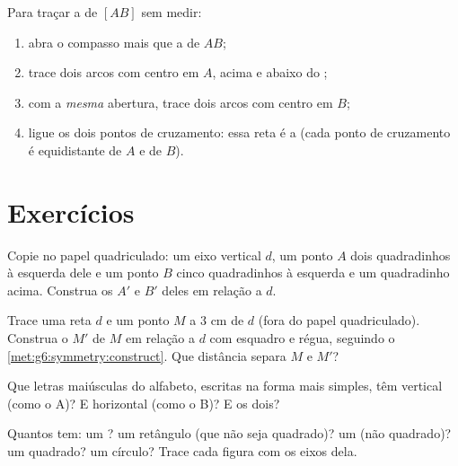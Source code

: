 \begin{method}\label{met:g6:symmetry:bisector}
Para traçar a  de $[AB]$ sem medir:
\begin{enumerate}
  \item abra o compasso mais que a  de $AB$;
  \item trace dois arcos com centro em $A$, acima e abaixo do
        ;
  \item com a \emph{mesma} abertura, trace dois arcos com centro em
        $B$;
  \item ligue os dois pontos de cruzamento: essa reta é a 
        (cada ponto de cruzamento é equidistante de $A$ e de $B$).
\end{enumerate}
\end{method}

\section{Exercícios}

\begin{exercise}[$\star$]\label{exo:g6:symmetry:1}
Copie no papel quadriculado: um eixo vertical $d$, um ponto $A$ dois
quadradinhos à esquerda dele e um ponto $B$ cinco quadradinhos à
esquerda e um quadradinho acima. Construa os  $A'$ e $B'$
deles em relação a $d$.
\end{exercise}

\begin{exercise}[$\star$]\label{exo:g6:symmetry:2}
Trace uma reta $d$ e um ponto $M$ a $3$ cm de $d$ (fora do papel
quadriculado). Construa o  $M'$ de $M$ em relação a $d$ com
esquadro e régua, seguindo o \cref{met:g6:symmetry:construct}. Que
distância separa $M$ e $M'$?
\end{exercise}

\begin{exercise}[$\star$]\label{exo:g6:symmetry:3}
Que letras maiúsculas do alfabeto, escritas na forma mais simples, têm
 vertical (como o A)? E horizontal (como o B)? E os
dois?
\end{exercise}

\begin{exercise}[$\star$]\label{exo:g6:symmetry:4}
Quantos  tem: um ? um retângulo
(que não seja quadrado)? um  (não quadrado)? um quadrado? um
círculo? Trace cada figura com os eixos dela.
\end{exercise}

